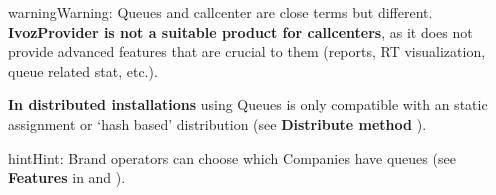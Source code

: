 \documentclass[letterpaper,10pt,english]{sphinxmanual}
\begin{document}
\begin{notice}{warning}{Warning:}
Queues and callcenter are close terms but different. \textbf{IvozProvider
is not a suitable product for callcenters}, as it does not provide
advanced features that are crucial to them (reports, RT visualization,
queue related stat, etc.).
\end{notice}

\textbf{In distributed installations} using Queues is only compatible with an static
assignment or `hash based' distribution (see \textbf{Distribute method} {\hyperref[internal_calls/brand_portal:remaining\string-parameters]{}}).

\begin{notice}{hint}{Hint:}
Brand operators can choose which Companies have queues (see \textbf{Features}
in {\hyperref[internal_calls/brand_portal:brand\string-configuration]{}} and {\hyperref[internal_calls/company_portal:company\string-configuration]{}}).
\end{notice}
\end{document}
